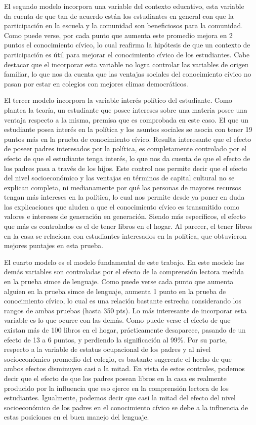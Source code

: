 \documentclass[12pt,twoside]{templates/facsothesis}
\begin{document}
El segundo modelo incorpora una variable del contexto educativo, esta variable da cuenta de que tan de acuerdo están los estudiantes en general con que la participación en la escuela y la comunidad son beneficiosos para la comunidad. Como puede verse, por cada punto que aumenta este promedio mejora en 2 puntos el conocimiento cívico, lo cual reafirma la hipótesis de que un contexto de participación es útil para mejorar el conocimiento cívico de los estudiantes. Cabe destacar que el incorporar esta variable no logra controlar las variables de origen familiar, lo que nos da cuenta que las ventajas sociales del conocimiento cívico no pasan por estar en colegios con mejores climas democráticos.

El tercer modelo incorpora la variable interés político del estudiante. Como plantea la teoría, un estudiante que posee intereses sobre una materia posee una ventaja respecto a la misma, premisa que es comprobada en este caso. El que un estudiante posea interés en la política y los asuntos sociales se asocia con tener 19 puntos más en la prueba de conocimiento cívico. Resulta interesante que el efecto de poseer padres interesados por la política, es completamente controlado por el efecto de que el estudiante tenga interés, lo que nos da cuenta de que el efecto de los padres pasa a través de los hijos. Este control nos permite decir que el efecto del nivel socioeconómico y las ventajas en términos de capital cultural no se explican completa, ni medianamente por qué las personas de mayores recursos tengan más intereses en la política, lo cual nos permite desde ya poner en duda las explicaciones que aluden a que el conocimiento cívico es transmitido como valores e intereses de generación en generación. Siendo más específicos, el efecto que más es controlados es el de tener libros en el hogar. Al parecer, el tener libros en la casa se relaciona con estudiantes interesados en la política, que obtuvieron mejores puntajes en esta prueba.

El cuarto modelo es el modelo fundamental de este trabajo. En este modelo las demás variables son controladas por el efecto de la comprensión lectora medida en la prueba simce de lenguaje. Como puede verse cada punto que aumenta alguien en la prueba simce de lenguaje, aumenta 1 punto en la prueba de conocimiento cívico, lo cual es una relación bastante estrecha considerando los rangos de ambas pruebas (hasta 350 pts). Lo más interesante de incorporar esta variable es lo que ocurre con las demás. Como puede verse el efecto de que existan más de 100 libros en el hogar, prácticamente desaparece, pasando de un efecto de 13 a 6 puntos, y perdiendo la significación al 99\%. Por su parte, respecto a la variable de estatus ocupacional de los padres y al nivel socioeconómico promedio del colegio, es bastante sugerente el hecho de que ambos efectos disminuyen casi a la mitad. En vista de estos controles, podemos decir que el efecto de que los padres posean libros en la casa es realmente producido por la influencia que eso ejerce en la comprensión lectora de los estudiantes. Igualmente, podemos decir que casi la mitad del efecto del nivel socioeconómico de los padres en el conocimiento cívico se debe a la influencia de estas posiciones en el buen manejo del lenguaje.
\end{document}
